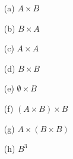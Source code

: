 \documentclass[12pt]{amsart}
\numberwithin{equation}{section}
\theoremstyle{definition}
\theoremstyle{remark}
\begin{document}
\begin{enumerate}

\item[(a)] $A \times B$

\item[(b)] $B \times A$

\item[(c)] $A \times A$

\item[(d)] $B \times B$

\item[(e)] $\emptyset \times B$

\item[(f)] $(A \times B) \times B$

\item[(g)] $A \times (B \times B)$

\item[(h)] $B^3$

\end{enumerate}
\end{document}
